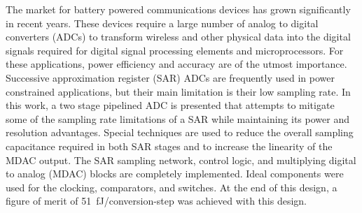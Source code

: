 The market for battery powered communications devices has grown significantly in recent years. These devices require a large number of analog to digital converters (ADCs) to transform wireless and other physical data into the digital signals required for digital signal processing elements and microprocessors. For these applications, power efficiency and accuracy are of the utmost importance. Successive approximation register (SAR) ADCs are frequently used in power constrained applications, but their main limitation is their low sampling rate. In this work, a two stage pipelined ADC is presented that attempts to mitigate some of the sampling rate limitations of a SAR while maintaining its power and resolution advantages. Special techniques are used to reduce the overall sampling capacitance required in both SAR stages and to increase the linearity of the MDAC output. The SAR sampling network, control logic, and multiplying digital to analog (MDAC) blocks are completely implemented. Ideal components were used for the clocking, comparators, and switches. At the end of this design, a figure of merit of \SI{51}{\femto\joule}/conversion-step was achieved with this design. 